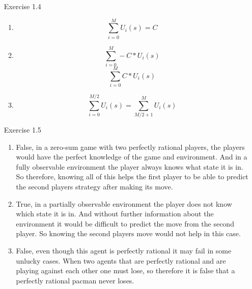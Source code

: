 \documentclass[letterpaper, 12pt]{article}
\begin{document}
\begin{enumerate}
\begin{enumerate}
    \end{enumerate}
    \item[Exercise 1.4]
    \begin{enumerate}
        \item \[ \sum_{i=0}^{M} U_i(s)=C \]
        \item \[ \sum_{i=0}^{M} -C*U_i(s) \] \[ \sum_{i=0}^{M} C*U_i(s) \]
        \item \[ \sum_{i=0}^{M/2} U_i(s)  = \sum_{M/2+1}^{M} U_i(s) \]          
    \end{enumerate}   
    \item[Exercise 1.5]
    \begin{enumerate}
        \item False, in a zero-sum game with two perfectly rational players, the players 
            would have the perfect knowledge of the game and environment. And in a fully observable 
            environment the player always knows what state it is in. So therefore, knowing all of this
            helps the first player to be able to predict the second players strategy after making its move.
        \item True, in a partially observable environment the player does not know which state it is in. And without 
            further information about the environment it would be difficult to predict the move from the second player. 
            So knowing the second players move would not help in this case.
        \item False, even though this agent is perfectly rational it may fail in some unlucky cases.
            When two agents that are perfectly rational and are playing against each other one must lose, so
            therefore it is false that a perfectly rational pacman never loses.
    \end{enumerate} 
\end{enumerate}
\end{document}
